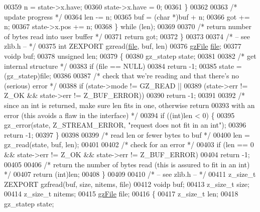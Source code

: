 \begin{DoxyCode}
00359             n = state->x.have;
00360             state->x.have = 0;
00361         \}
00362 
00363         \textcolor{comment}{/* update progress */}
00364         len -= n;
00365         buf = (\textcolor{keywordtype}{char} *)buf + n;
00366         got += n;
00367         state->x.pos += n;
00368     \} \textcolor{keywordflow}{while} (len);
00369 
00370     \textcolor{comment}{/* return number of bytes read into user buffer */}
00371     \textcolor{keywordflow}{return} got;
00372 \}
00373 
00374 \textcolor{comment}{/* -- see zlib.h -- */}
00375 \textcolor{keywordtype}{int} ZEXPORT gzread(\hyperlink{structfile}{file}, buf, len)
00376     \hyperlink{structgz_file__s}{gzFile} \hyperlink{structfile}{file};
00377     voidp buf;
00378     \textcolor{keywordtype}{unsigned} len;
00379 \{
00380     gz\_statep state;
00381 
00382     \textcolor{comment}{/* get internal structure */}
00383     \textcolor{keywordflow}{if} (file == NULL)
00384         \textcolor{keywordflow}{return} -1;
00385     state = (gz\_statep)file;
00386 
00387     \textcolor{comment}{/* check that we're reading and that there's no (serious) error */}
00388     \textcolor{keywordflow}{if} (state->mode != GZ\_READ ||
00389             (state->err != Z\_OK && state->err != Z\_BUF\_ERROR))
00390         \textcolor{keywordflow}{return} -1;
00391 
00392     \textcolor{comment}{/* since an int is returned, make sure len fits in one, otherwise return}
00393 \textcolor{comment}{       with an error (this avoids a flaw in the interface) */}
00394     \textcolor{keywordflow}{if} ((\textcolor{keywordtype}{int})len < 0) \{
00395         gz\_error(state, Z\_STREAM\_ERROR, \textcolor{stringliteral}{"request does not fit in an int"});
00396         \textcolor{keywordflow}{return} -1;
00397     \}
00398 
00399     \textcolor{comment}{/* read len or fewer bytes to buf */}
00400     len = gz\_read(state, buf, len);
00401 
00402     \textcolor{comment}{/* check for an error */}
00403     \textcolor{keywordflow}{if} (len == 0 && state->err != Z\_OK && state->err != Z\_BUF\_ERROR)
00404         \textcolor{keywordflow}{return} -1;
00405 
00406     \textcolor{comment}{/* return the number of bytes read (this is assured to fit in an int) */}
00407     \textcolor{keywordflow}{return} (\textcolor{keywordtype}{int})len;
00408 \}
00409 
00410 \textcolor{comment}{/* -- see zlib.h -- */}
00411 z\_size\_t ZEXPORT gzfread(buf, size, nitems, file)
00412     voidp buf;
00413     z\_size\_t size;
00414     z\_size\_t nitems;
00415     \hyperlink{structgz_file__s}{gzFile} file;
00416 \{
00417     z\_size\_t len;
00418     gz\_statep state;

\end{DoxyCode}
